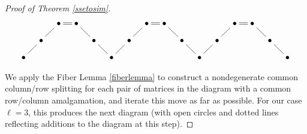 \documentclass{amsart}
\theoremstyle{definition}
\theoremstyle{remark}
\numberwithin{equation}{section}
\begin{document}
{{\begin{proof}[Proof of Theorem 
\ref{ssetosim}]
\begin{equation}
\xymatrix@=10pt{
     &                        & \bullet  \ar@{-}[dl] \ar@{=}[r] & \bullet \ar@{-}[dr] &                & 
    &                        & \bullet  \ar@{-}[dl] \ar@{=}[r] & \bullet \ar@{-}[dr] &                & 
    &                        & \bullet  \ar@{-}[dl] \ar@{=}[r] & \bullet \ar@{-}[dr] &                & \\
    & \bullet        \ar@{-}[dl] &                             &               & \bullet \ar@{-}[dr] &  
    & \bullet        \ar@{-}[dl] &                             &               & \bullet \ar@{-}[dr] &  
    & \bullet        \ar@{-}[dl] &                             &               & \bullet \ar@{-}[dr] &  \\
 \bullet &                    &                             &               &                 &   \bullet
         &                    &                             &               &                 &   \bullet 
          &                    &                             &               &                 &   \bullet 
}
\end{equation} 

We apply the Fiber Lemma \ref{fiberlemma} to construct a 
nondegenerate common column/row splitting for each
pair of  matrices in the diagram with a common row/column 
amalgamation, and iterate this move
as far as possible. For our case $\ell =3$, this produces 
the next diagram (with open circles 
and dotted lines reflecting additions to the diagram at this step). 


\end{proof}}}
\end{document}
